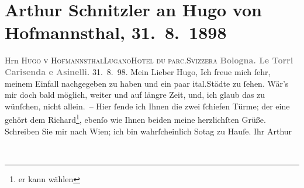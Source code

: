 

         
         \renewcommand{\erwaehntePersonen}{Personen: Richard Beer-Hofmann, Hugo von Hofmannsthal}
         \renewcommand{\erwaehnteOrte}{Orte: Bologna, Hôtel du Parc, Italien, Le due Torri: Garisenda e degli Asinelli, Lugano, Schweiz, Wien}
         \renewcommand{\erwaehnteWerke}{}
               \section[Arthur Schnitzler an Hugo von Hofmannsthal, 31. 8. 1898]{ Arthur Schnitzler an Hugo von Hofmannsthal, 31. 8. 1898}\nopagebreak{}\rehead{ }\begin{ledgroupsized}[t]{13cm}\normalsize\beginnumbering \toendnotes[C]{\smallbreak\pagebreak[2]} 
\toendnotes[C]{\smallbreak}\pstart{}{\pb}Hrn \textsc{Hugo v Hofmannsthal}\pend{}\pstart{}\textsc{Lugano}\pend{}\pstart{}\textsc{Hotel du parc}.\pend{}\pstart{}\textsc{Svizzera}\pend{}{\bigskip}\pstart
           \noindent{}\centering{}\textcolor{gray}{\textbf{{\pb}Bologna. Le Torri Carisenda e Asinelli.}}\pend
           \pstart
           \raggedleft{}31. 8. 98.\pend
           \pstart{}Mein Lieber Hugo, \pend\pstart
           Ich freue mich ſehr, meinem Einfall nachgegeben zu haben und ein paar ital.Städte zu ſehen. Wär’s mir doch bald möglich,
               weiter und auf längre Zeit, und, ich glaub das zu wünſchen, nicht allein. – Hier
               ſende ich Ihnen die zwei ſchiefen Türme; der
               eine gehört dem Richard\footnote{\noindent{}er kann wählen}, ebenſo wie Ihnen beiden meine herzlichſten Grüße. Schreiben Sie mir nach Wien; ich bin wahrſcheinlich So{\geminationn}tag zu Hauſe.\pend
           \pstart Ihr \spacefill\mbox{Arthur}\pend{}\pstart
           \noindent{}\label{T_L00842-1v}\label{T_L00842-1h}\pend
           
         
         \endnumbering{}\end{ledgroupsized}  \newcommand{\dateiname}{L00842}\newcommand{\titel}{Arthur Schnitzler an Hugo von Hofmannsthal, 31. 8. 1898}\newcommand{\editorInnen}{Martin Anton Müller und Gerd-Hermann Susen}
      
